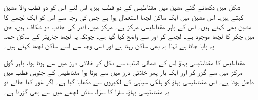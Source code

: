 شکل  میں دکھائے گئے مشین میں مقناطیس کے دو قطب ہیں، اس لئے اس کو دو قطب والا مشین کہتے ہیں۔ اس مشین میں ایک ساکن لچھا استعمال ہوا ہے جس کی وجہ سے اس کو ایک لچھے کا مشین بھی کہتے ہیں۔ اس کے باہر مقناطیسی مرکز ہے۔ مرکز میں، اندر کی جانب دو  شکاف ہیں، جن میں   چکر کا لچھا موجود ہے۔ لچھے کو  اور  سے واضح کیا گیا ہے۔ چونکہ یہ لچھا جنریٹر کے ساکن حصہ پہ پایا جاتا ہے لہٰذا  یہ بھی ساکن رہتا ہے اور اسی وجہ سے اسے  ساکن لچھا کہتے ہیں۔

 مقناطیس کا مقناطیسی بہاؤ اس کے شمالی قطب   سے نکل کر خلائی درز میں سے ہوتا ہوا، باہر گول مرکز میں سے گزر کر اور ایک بار پھر  خلائی درز میں سے ہوتا ہوا مقناطیس کے جنوبی قطب    میں داخل ہوتا ہے۔ اس مقناطیسی بہاؤ کو  ہلکی سیاہی کے لکیروں سے دکھایا گیا ہے۔  اگر غور کیا جائے تو یہ  مقناطیسی بہاؤ، سارا کا سارا، ساکن لچھے میں سے بھی گزرتا ہے۔

